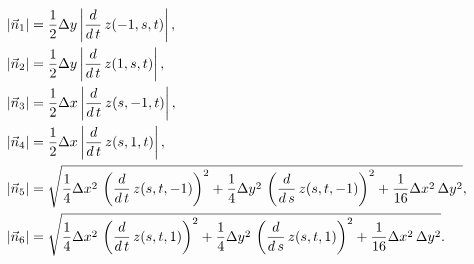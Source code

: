\documentclass[11pt]{article}
\begin{document}
\begin{align*}
  \left| \vec n_{1}\right|  & = \frac{1}{2}\Delta y\left| \frac{d}{d\,t}\,z(-1 , s , t)\right|, \\
  \left| \vec n_{2}\right|  & = \frac{1}{2}\Delta y\left| \frac{d}{d\,t}\,z(1 , s , t)\right|, \\
  \left| \vec n_{3}\right|  & = \frac{1}{2}\Delta x\left| \frac{d}{d\,t}\,z(s , -1 , t)\right|,\\
  \left| \vec n_{4}\right|  & = \frac{1}{2}\Delta x\left| \frac{d}{d\,t}\,z(s , 1 , t)\right|, \\
  \left| \vec n_{5}\right|  & = \sqrt{\frac{1}{4}\Delta x^2\,\left(\frac{d}{d\,t}\,z(s , t , -1)\right)^2+\frac{1}{4}\Delta y^2\,\left(\frac{d}{d\,s}\,z(s , t , -1)\right)^2+\frac{1}{16}\Delta x^2\,\Delta y^2}, \\
  \left| \vec n_{6}\right|  & = \sqrt{\frac{1}{4}\Delta x^2\,\left(\frac{d}{d\,t}\,z(s , t , 1)\right)^2 +\frac{1}{4}\Delta y^2\,\left(\frac{d}{d\,s}\,z(s , t , 1)\right)^2 +\frac{1}{16}\Delta x^2\,\Delta y^2}. \\
\end{align*}



\end{document}
